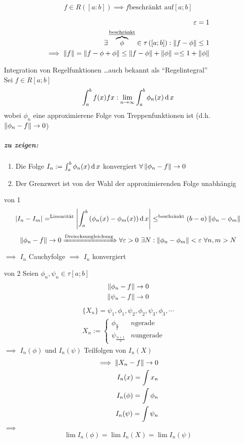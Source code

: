 \begin{Sat}
  \[f\in R\left( [a:b] \right)\implies f \text{beschränkt auf} [a;b]\]
\end{Sat}
\begin{Bew}
  \begin{align*}
    \varepsilon =1\\
    \exists \overbrace{\phi}^{\text{\underline{beschränkt}}}\in\tau\left( [a;b] \right):\left\| f-\phi \right\|\leq 1\\
    \implies \left\| f \right\|=\left\| f-\phi + \phi \right\|\leq \left\| f-\phi \right\|+\left\| \phi \right\|=\leq 1+\left\| \phi \right\|
  \end{align*}
\end{Bew}
\begin{Def}{Integration von Regelfunktionen}
  \ldots auch bekannt als ``Regelintegral''\\
  Sei $f\in R[a;b]$
  \[\int_a^bf(x)fx:\displaystyle\lim_{n\rightarrow\infty}\int^b_a\phi_n(x)\operatorname{d} x\]
  wobei $\phi_n$ eine approximierene Folge von Treppenfunktionen ist (d.h. $\left\| \phi_n-f \right\|\to 0$)
\end{Def}
\subparagraph{zu zeigen:}
\begin{enumerate}
  \item Die Folge $I_n:=\int^b_a\phi_n(x)\operatorname{d} x$ konvergiert $\forall \left\| \phi_n-f \right\|\to 0$
  \item Der Grenzwert ist von der Wahl der approximierenden Folge unabhängig
\end{enumerate}
\begin{Bew}{von 1}
  \[\left| I_n-I_m \right|=^{\text{Linearität}}\left| \int^b_a\left( \phi_n(x)-\phi_m(x) \right)\operatorname{d} x \right|\leq^{\text{beschränkt}} (b-a)\left\| \phi_n-\phi_m \right\|\]
  \[\Norm{\phi_n-f}\to 0 \xRightarrow{\text{Dreiecksungleichung}} \forall\varepsilon>0\ \exists N: \Norm{\phi_n-\phi_m}<\varepsilon\ \forall n,m> N\]
  $\implies$ $I_n$ Cauchyfolge $\implies$ $I_n$ konvergiert
\end{Bew}
\begin{Bew}{von 2}
  Seien $\phi_n, \psi_n\in \tau[a;b]$
  \begin{align*}
    \left\| \phi_n-f \right\|\to0\\
    \left\| \psi_n-f \right\|\to0
  \end{align*}
  \begin{align*}
    \{X_n\}=\psi_1,\phi_1,\psi_2,\phi_2,\psi_3,\phi_3,\cdots\\
    X_n:=\begin{cases}
      \phi_{\frac{n}{2}}& n \text{gerade}\\
      \psi_{\frac{n+1}{2}}& n \text{ungerade}
    \end{cases}
  \end{align*}
  $\implies$ $I_n(\phi)$ und $I_n(\psi)$ Teilfolgen von $I_n(X)$
  \begin{align*}
    \implies \left\| X_n-f \right\|\to 0\\
    I_n(x)=\int x_n\\ I_n(\phi)=\int \phi_n\\ I_n(\psi)=\int \psi_n\\
  \end{align*}
  $\implies$
  \begin{align*}
    \lim I_n(\phi)=\lim I_n(X)=\lim I_n(\psi)
  \end{align*}
\end{Bew}
